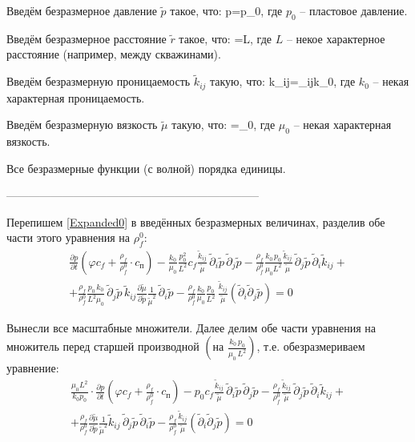 Введём безразмерное давление $\tilde{p}$ такое, что:
\beq
p=\cdot p_0,
\eeq
где $p_0$ -- пластовое давление.

Введём безразмерное расстояние $\tilde{r}$ такое, что:
\beq
{}=\cdot L,
\eeq
где $L$ -- некое характерное расстояние (например, между скважинами).

Введём безразмерную проницаемость $\tilde{k}_{ij}$ такую, что:
\beq
k_{ij}=_{ij}\cdot k_0,
\eeq
где $k_0$ -- некая характерная проницаемость.

Введём безразмерную вязкость $\tilde{\mu}$ такую, что:
\beq
\mu=\tilde{\mu}\cdot\mu_0,
\eeq
где $\mu_0$ -- некая характерная вязкость.

Все безразмерные функции (с волной) порядка единицы.

--------------------------------------------------------------------

Перепишем \eqref{Expanded0} в введённых безразмерных величинах, разделив обе части этого уравнения на $\rho_f^0$:
\begin{multline}
\frac{\partial p}{\partial t}\left(\varphi c_f+\frac{\rho_f}{\rho_f^0}\cdot c_\text{п}\right)-\frac{k_0}{\mu_0}\frac{p_0^2}{L^2}c_f\frac{\tilde{k}_{ij}}{\tilde{\mu}}\,\tilde{\partial}_i\tilde{p}\,\tilde{\partial}_j\tilde{p}-\frac{\rho_f}{\rho_f^0}\frac{k_0\,p_0}{\mu_0L^2}\frac{\tilde{k}_{ij}}{\tilde{\mu}}\,\tilde{\partial}_j\tilde{p}\,\tilde{\partial}_i\tilde{k}_{ij}+\\+\frac{\rho_f}{\rho_f^0}\frac{p_0\,k_0}{L^2\mu_0}\,\tilde{\partial}_j\tilde{p}\,\tilde{k}_{ij}\frac{\partial\tilde{\mu}}{\partial\tilde{p}}\frac{1}{\tilde{\mu}^2}\,\tilde{\partial}_i\tilde{p}-\frac{\rho_f}{\rho_f^0}\frac{k_0}{\mu_0}\frac{p_0}{L^2}\,\frac{\tilde{k}_{ij}}{\tilde{\mu}}\left(\tilde{\partial}_i\tilde{\partial}_j\tilde{p}\right)=0
\end{multline}

Вынесли все масштабные множители. Далее делим обе части уравнения на множитель перед старшей производной $\left(\text{на }\frac{k_0\,p_0}{\mu_0\,L^2}\right)$, т.е. обезразмериваем уравнение:
\begin{multline}\label{PiezoEqDiv0}
\frac{\mu_0L^2}{k_0p_0}\cdot\frac{\partial p}{\partial t}\left(\varphi c_f+\frac{\rho_f}{\rho_f^0}\cdot c_\text{п}\right)-p_0c_f\frac{\tilde{k}_{ij}}{\tilde{\mu}}\,\tilde{\partial}_i\tilde{p}\,\tilde{\partial}_j\tilde{p}-\frac{\rho_f}{\rho_f^0}\frac{\tilde{k}_{ij}}{\tilde{\mu}}\,\tilde{\partial}_j\tilde{p}\,\tilde{\partial}_i\tilde{k}_{ij}+\\+\frac{\rho_f}{\rho_f^0}\frac{\partial\tilde{\mu}}{\partial\tilde{p}}\frac{1}{\tilde{\mu}^2}\tilde{k}_{ij}\,\tilde{\partial}_j\tilde{p}\,\tilde{\partial}_i\tilde{p}-\frac{\rho_f}{\rho_f^0}\frac{\tilde{k}_{ij}}{\tilde{\mu}}\left(\tilde{\partial}_i\tilde{\partial}_j\tilde{p}\right)=0
\end{multline}

